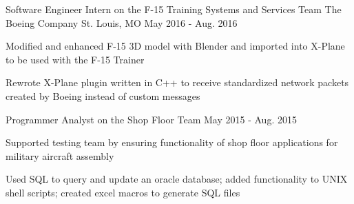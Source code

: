 \begin{cventries}
  \cventry
    {Software Engineer Intern on the F-15 Training Systems and Services Team} %
    {The Boeing Company} %
    {St. Louis, MO} %
    {May 2016 - Aug. 2016} %
    {
      \begin{cvitems} %
        \item {Modified and enhanced F-15 3D model with Blender and imported into X-Plane to be used with the F-15 Trainer}
        \item {Rewrote X-Plane plugin written in C++ to receive standardized network packets created by Boeing instead of custom messages}
      \end{cvitems}
    }

  \cventry
    {Programmer Analyst on the Shop Floor Team} %
    {} %
    {} %
    {May 2015 - Aug. 2015} %
    {
      \begin{cvitems} %
        \item {Supported testing team by ensuring functionality of shop floor applications for military aircraft assembly}
        \item {Used SQL to query and update an oracle database; added functionality to UNIX shell scripts; created excel macros to generate SQL files}
      \end{cvitems}
    }

\end{cventries}

